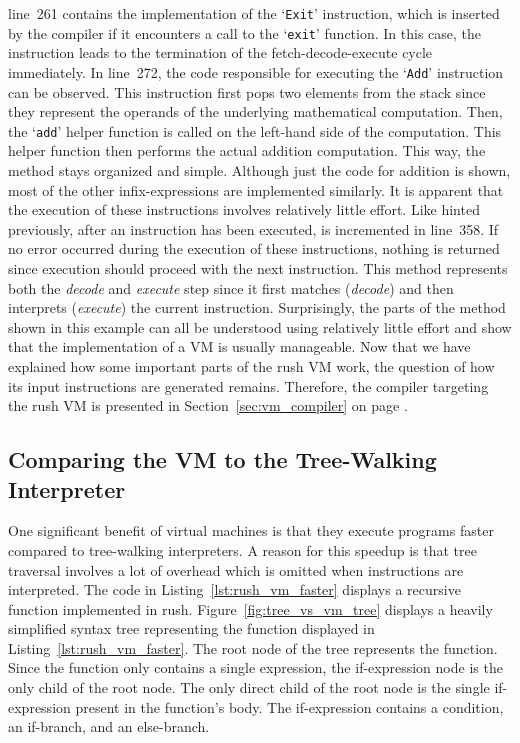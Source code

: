 line~261 contains the implementation of the `\texttt{Exit}' instruction, which is inserted by the compiler if it encounters a call to the `\texttt{exit}' function.
In this case, the instruction leads to the termination of the fetch-decode-execute cycle immediately.
In line~272, the code responsible for executing the `\texttt{Add}' instruction can be observed.
This instruction first pops two elements from the stack since they represent the operands of the underlying mathematical computation.
Then, the `\texttt{add}' helper function is called on the left-hand side of the computation.
This helper function then performs the actual addition computation.
This way, the  method stays organized and simple.
Although just the code for addition is shown, most of the other infix-expressions are implemented similarly.
It is apparent that the execution of these instructions involves relatively little effort.
Like hinted previously, after an instruction has been executed,  is incremented in line~358.
If no error occurred during the execution of these instructions, nothing is returned since execution should proceed with the next instruction.
This method represents both the \emph{decode} and \emph{execute} step since it first matches (\emph{decode}) and then interprets (\emph{execute}) the current instruction.
Surprisingly, the parts of the method shown in this example can all be understood using relatively little effort and show that the implementation of a VM is usually manageable.
Now that we have explained how some important parts of the rush VM work, the question of how its input instructions are generated remains.
Therefore, the compiler targeting the rush VM is presented in Section~\ref{sec:vm_compiler} on page \pageref{sec:vm_compiler}.

\subsection{Comparing the VM to the Tree-Walking Interpreter}

One significant benefit of virtual machines is that they execute programs faster compared to tree-walking interpreters.
A reason for this speedup is that tree traversal involves a lot of overhead which is omitted when instructions are interpreted.
The code in Listing~\ref{lst:rush_vm_faster} displays a recursive function implemented in rush.
Figure~\ref{fig:tree_vs_vm_tree} displays a heavily simplified syntax tree representing the function displayed in Listing~\ref{lst:rush_vm_faster}.
The root node of the tree represents the  function.
Since the function only contains a single expression, the if-expression node is the only child of the root node.
The only direct child of the root node is the single if-expression present in the function's body.
The if-expression contains a condition, an if-branch, and an else-branch.

